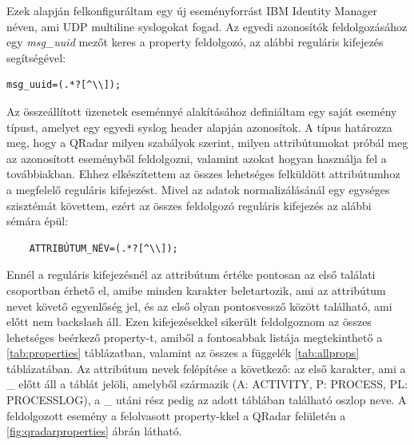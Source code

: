 Ezek alapján felkonfiguráltam egy új eseményforrást IBM Identity Manager néven, ami UDP multiline syslogokat fogad. Az egyedi azonosítók feldolgozásához egy \textit{msg\_uuid} mezőt keres a property feldolgozó, az alábbi reguláris kifejezés segítségével: 

\begin{lstlisting}
msg_uuid=(.*?[^\\]);
\end{lstlisting}

Az összeállított üzenetek eseménnyé alakításához definiáltam egy saját esemény típust, amelyet egy egyedi syslog header alapján azonosítok. A típus határozza meg, hogy a QRadar milyen szabályok szerint, milyen attribútumokat próbál meg az azonosított eseményből feldolgozni, valamint azokat hogyan használja fel a továbbiakban. Ehhez elkészítettem az összes lehetséges felküldött attribútumhoz a megfelelő reguláris kifejezést. Mivel az adatok normalizálásánál egy egységes szisztémát követtem, ezért az összes feldolgozó reguláris kifejezés az alábbi sémára épül:

\begin{lstlisting}
	ATTRIBÚTUM_NÉV=(.*?[^\\]);
\end{lstlisting}

Ennél a reguláris kifejezésnél az attribútum értéke pontosan az első találati csoportban érhető el, amibe minden karakter beletartozik, ami az attribútum nevet követő egyenlőség jel, és az első olyan pontosvessző között található, ami előtt nem backslash áll. Ezen kifejezésekkel sikerült feldolgoznom az összes lehetséges beérkező property-t, amiből a fontosabbak listája megtekinthető a \ref{tab:properties} táblázatban, valamint az összes a függelék \ref{tab:allprops} táblázatában. Az attribútum nevek felépítése a következő: az első karakter, ami a \_ előtt áll a táblát jelöli, amelyből származik (A: ACTIVITY, P: PROCESS, PL: PROCESSLOG), a \_ utáni rész pedig az adott táblában található oszlop neve. A feldolgozott esemény a felolvasott property-kkel a QRadar felületén a \ref{fig:qradarproperties} ábrán látható.


